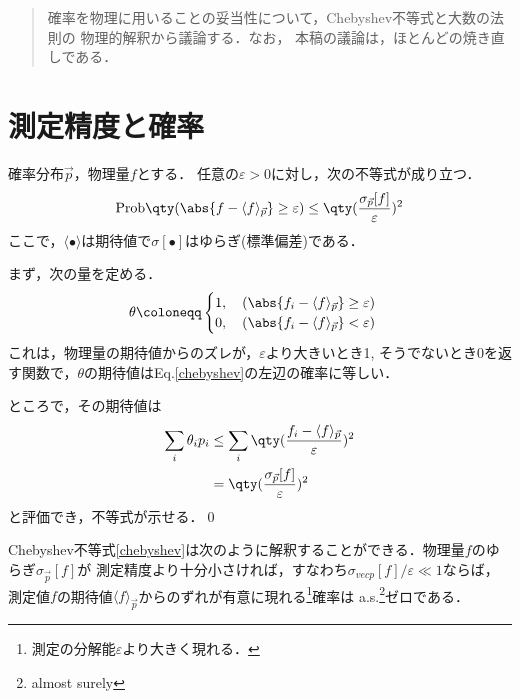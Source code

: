 \begin{abstract}

  確率を物理に用いることの妥当性について，Chebyshev不等式と大数の法則の
  物理的解釈から議論する．なお，
  本稿の議論は，ほとんど\cite{Tasaki_statmech}の焼き直しである．
\end{abstract}
\section{測定精度と確率}
  \begin{thm}[Chebyshev不等式]
    確率分布$\vec{p}$，物理量$f$とする．
    任意の$\varepsilon>0$に対し，次の不等式が成り立つ．
    \begin{align}
      \mathrm{Prob} \qty(\abs{f-\langle f \rangle_{\vec{p}}} \geq \varepsilon) \leq \qty(\frac{\sigma_{\vec{p}}[f]}{\varepsilon})^2\label{chebyshev}
    \end{align}
    ここで，$\langle\bullet\rangle$は期待値で$\sigma[\bullet]$はゆらぎ(標準偏差)である．
  \end{thm}
  \begin{pr}
    まず，次の量を定める．
    \begin{align}
      \theta \coloneqq 
        \begin{cases}
          1,\quad (\abs{f_i-\langle f \rangle _{\vec{p}}}\geq \varepsilon)\\
          0,\quad (\abs{f_i-\langle f \rangle _{\vec{p}}} < \varepsilon)
        \end{cases}
    \end{align}
    これは，物理量の期待値からのズレが，$\varepsilon$より大きいとき1,
    そうでないとき0を返す関数で，$\theta$の期待値はEq.\eqref{chebyshev}の左辺の確率に等しい．

    ところで，その期待値は
    \begin{align}
      \sum_{i} \theta_ip_i &\leq \sum_{i}\qty(\frac{f_i-\langle f \rangle_{\vec{p}}}{\varepsilon})^2\\
      &=\qty(\frac{\sigma_{\vec{p}}[f]}{\varepsilon})^2
    \end{align}
    と評価でき，不等式が示せる．\qed
  \end{pr}

  Chebyshev不等式\eqref{chebyshev}は次のように解釈することができる．物理量$f$のゆらぎ$\sigma_{\vec{p}}[f]$が
  測定精度より十分小さければ，すなわち$\sigma_{vec{p}}[f]/\varepsilon \ll 1$ならば，
  測定値$f$の期待値$\langle f \rangle_{\vec{p}}$からのずれが有意に現れる\footnote{測定の分解能$\varepsilon$より大きく現れる．}確率は
  a.s.\footnote{almost surely}ゼロである．
